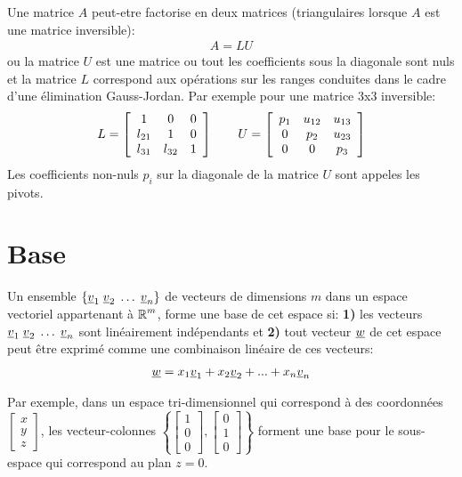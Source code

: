 Une matrice $A$ peut-etre factorise en deux matrices (triangulaires lorsque $A$ est une matrice inversible):
%
\begin{align}
A = LU 
\end{align}
%
ou la matrice $U$ est une matrice ou tout les coefficients sous la diagonale sont nuls et la matrice $L$ correspond aux opérations sur les ranges conduites dans le cadre d'une élimination Gauss-Jordan. Par exemple pour une matrice 3x3 inversible:
%
\begin{align}
L= 
\left[ \begin{array}{c c c } 
1      &   0       & 0   \\ 
l_{21} &   1       & 0   \\  
l_{31} & l_{32}    & 1
\end{array} \right]
\quad\quad
U = 
\left[ \begin{array}{c c c c c } 
p_{1} & u_{12} &  u_{13} \\ 
0     & p_{2}  &  u_{23}  \\ 
0     & 0      &  p_{3}
\end{array} \right]
\end{align}
%
Les coefficients non-nuls $p_i$ sur la diagonale de la matrice $U$ sont appeles les pivots.


\newpage
\section{Base}
\label{sec:base}

Un ensemble $\{ \underline{v}_1 \; \underline{v}_2 \; \hdots \; \underline{v}_n \}$ de vecteurs de dimensions $m$ dans un espace vectoriel appartenant à $\operatorname{\mathbb{R}}^m$, forme une base de cet espace si: \textbf{1)} les vecteurs $\underline{v}_1 \; \underline{v}_2 \; \hdots \; \underline{v}_n$ sont linéairement indépendants et \textbf{2)} tout vecteur $\underline{w}$ de cet espace peut être exprimé comme une combinaison linéaire de ces vecteurs:
\begin{align}
\underline{w} = x_1 \underline{v}_1 + x_2 \underline{v}_2 + ... + x_n \underline{v}_n
\end{align}

Par exemple, dans un espace tri-dimensionnel qui correspond à des coordonnées $
\left[
\begin{array}{c}
x \\ y \\ z
\end{array}
\right]
$, les vecteur-colonnes $\left\{ 
\left[
\begin{array}{c}
1 \\ 0 \\ 0
\end{array}
\right],
\left[
\begin{array}{c}
0 \\ 1 \\ 0
\end{array}
\right]
\right\}$
forment une base pour le sous-espace qui correspond au plan $z=0$.

